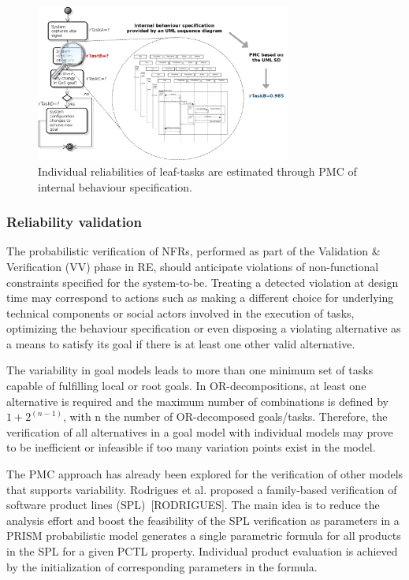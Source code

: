 \begin{figure}[ht!]
\centering
\includegraphics[width=0.75\textwidth]{imgs/MD_PMC.png}
\caption{Individual reliabilities of leaf-tasks are estimated through PMC of internal behaviour specification.}
\label{fig:MD_PMC}
\end{figure}

\subsubsection{Reliability validation}

The probabilistic verification of NFRs, performed as part of the Validation \& Verification (VV) phase in RE, should anticipate violations of non-functional constraints specified for the system-to-be. Treating a detected violation at design time may correspond to actions such as making a different choice for underlying technical components or social actors involved in the execution of tasks, optimizing the behaviour specification or even disposing a violating alternative as a means to satisfy its goal if there is at least one other valid alternative. 

The variability in goal models leads to more than one minimum set of tasks capable of fulfilling local or root goals. In OR-decompositions, at least one alternative is required and the maximum number of combinations is defined by $1 + 2^{(n-1)}$, with n the number of OR-decomposed goals/tasks. Therefore, the verification of all alternatives in a goal model with individual models may prove to be inefficient or infeasible if too many variation points exist in the model.

The PMC approach has already been explored for the verification of other models that supports variability. Rodrigues et al. proposed a family-based verification of software product lines (SPL)~[RODRIGUES]. The main idea is to reduce the analysis effort and boost the feasibility of the SPL verification as parameters in a PRISM probabilistic model generates a single parametric formula for all products in the SPL for a given PCTL property. Individual product evaluation is achieved by the initialization of corresponding parameters in the formula. 

